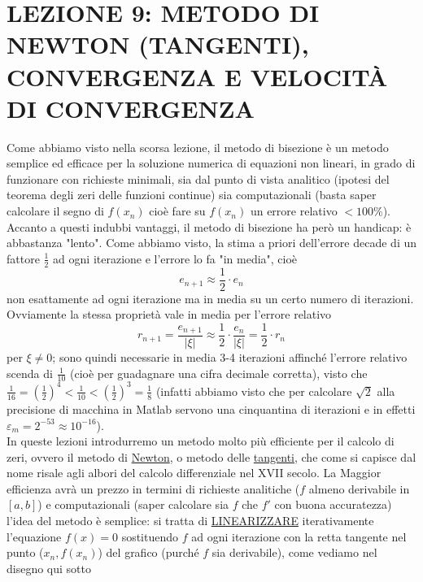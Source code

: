 \documentclass[12pt]{article}
\begin{document}
\section*{LEZIONE 9: METODO DI NEWTON (TANGENTI), CONVERGENZA E VELOCITÀ DI CONVERGENZA}
Come abbiamo visto nella scorsa lezione, il metodo di bisezione è un metodo semplice ed efficace per la soluzione numerica di equazioni non lineari, in grado di funzionare con richieste minimali, sia dal punto di vista analitico (ipotesi del teorema degli zeri delle funzioni continue) sia computazionali (basta saper calcolare il segno di $f(x_n)$ cioè fare su $f(x_n)$ un errore relativo $<100\%$).\\
Accanto a questi indubbi vantaggi, il metodo di bisezione ha però un handicap: è abbastanza "lento". Come abbiamo visto, la stima a priori dell'errore decade di un fattore $\frac{1}{2}$ ad ogni iterazione e l'errore lo fa "in media", cioè 
\begin{equation*}
    e_{n+1} \approx \frac{1}{2} \cdot e_n
\end{equation*}
non esattamente ad ogni iterazione ma in media su un certo numero di iterazioni.\\
Ovviamente la stessa proprietà vale in media per l'errore relativo
\begin{equation*}
    r_{n+1}=\frac{e_{n+1}}{|\xi|} \approx \frac{1}{2} \cdot \frac{e_n}{|\xi|} = \frac{1}{2} \cdot r_n
\end{equation*}
per $\xi \neq 0$; sono quindi necessarie in media 3-4 iterazioni affinché l'errore relativo scenda di $\frac{1}{10}$ (cioè per guadagnare una cifra decimale corretta), visto che $\frac{1}{16} = (\frac{1}{2})^4 < \frac{1}{10} < (\frac{1}{2})^3 = \frac{1}{8}$ (infatti abbiamo visto che per calcolare $\sqrt{2}$ alla precisione di macchina in Matlab servono una cinquantina di iterazioni e in effetti $\varepsilon_m = 2^{-53} \approx 10^{-16}$).\\
In queste lezioni introdurremo un metodo molto più efficiente per il calcolo di zeri, ovvero il metodo di \underline{Newton}, o metodo delle \underline{tangenti}, che come si capisce dal nome risale agli albori del calcolo differenziale nel XVII secolo. La Maggior efficienza avrà un prezzo in termini di richieste analitiche ($f$ almeno derivabile in $[a, b]$) e computazionali (saper calcolare sia $f$ che $f'$ con buona accuratezza) l'idea del metodo è semplice: si tratta di \underline{LINEARIZZARE} iterativamente l'equazione $f(x) = 0$ sostituendo $f$ ad ogni iterazione con la retta tangente nel punto ($x_n, f(x_n)$) del grafico (purché $f$ sia derivabile), come vediamo nel disegno qui sotto 
\end{document}
